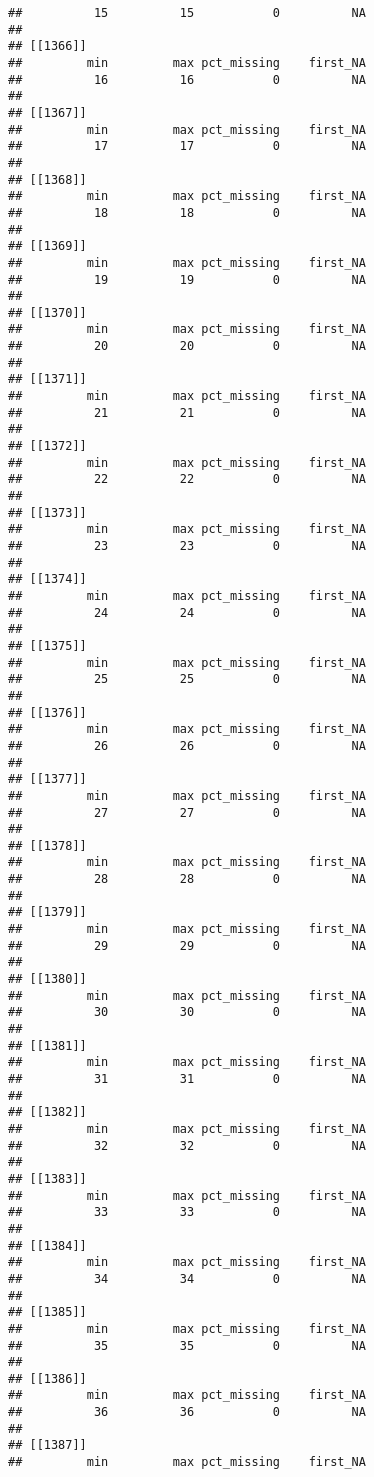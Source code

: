 \documentclass[
]{article}
\begin{document}
\begin{verbatim}
##          15          15           0          NA 
## 
## [[1366]]
##         min         max pct_missing    first_NA 
##          16          16           0          NA 
## 
## [[1367]]
##         min         max pct_missing    first_NA 
##          17          17           0          NA 
## 
## [[1368]]
##         min         max pct_missing    first_NA 
##          18          18           0          NA 
## 
## [[1369]]
##         min         max pct_missing    first_NA 
##          19          19           0          NA 
## 
## [[1370]]
##         min         max pct_missing    first_NA 
##          20          20           0          NA 
## 
## [[1371]]
##         min         max pct_missing    first_NA 
##          21          21           0          NA 
## 
## [[1372]]
##         min         max pct_missing    first_NA 
##          22          22           0          NA 
## 
## [[1373]]
##         min         max pct_missing    first_NA 
##          23          23           0          NA 
## 
## [[1374]]
##         min         max pct_missing    first_NA 
##          24          24           0          NA 
## 
## [[1375]]
##         min         max pct_missing    first_NA 
##          25          25           0          NA 
## 
## [[1376]]
##         min         max pct_missing    first_NA 
##          26          26           0          NA 
## 
## [[1377]]
##         min         max pct_missing    first_NA 
##          27          27           0          NA 
## 
## [[1378]]
##         min         max pct_missing    first_NA 
##          28          28           0          NA 
## 
## [[1379]]
##         min         max pct_missing    first_NA 
##          29          29           0          NA 
## 
## [[1380]]
##         min         max pct_missing    first_NA 
##          30          30           0          NA 
## 
## [[1381]]
##         min         max pct_missing    first_NA 
##          31          31           0          NA 
## 
## [[1382]]
##         min         max pct_missing    first_NA 
##          32          32           0          NA 
## 
## [[1383]]
##         min         max pct_missing    first_NA 
##          33          33           0          NA 
## 
## [[1384]]
##         min         max pct_missing    first_NA 
##          34          34           0          NA 
## 
## [[1385]]
##         min         max pct_missing    first_NA 
##          35          35           0          NA 
## 
## [[1386]]
##         min         max pct_missing    first_NA 
##          36          36           0          NA 
## 
## [[1387]]
##         min         max pct_missing    first_NA 

\end{verbatim}
\end{document}
